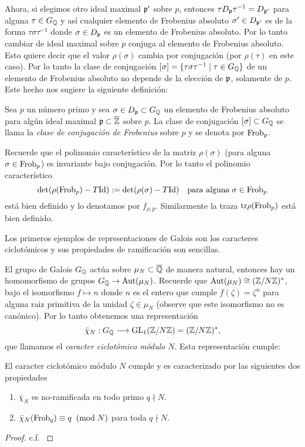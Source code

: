 \documentclass[../../tesis_maestria]{subfiles}
\begin{document}
Ahora, si elegimos otro ideal maximal $\mathfrak{p}'$ sobre $p$, entonces $\tau D_{\mathfrak{p}}\tau^{-1}=D_{\mathfrak{p}'}$ para alguna $\tau\in G_{\mathbb{Q}}$ y as\'i cualquier elemento de Frobenius absoluto $\sigma'\in D_{\mathfrak{p}'}$ es de la forma $\tau\sigma\tau^{-1}$ donde $\sigma\in D_{\mathfrak{p}}$ es un elemento de Frobenius absoluto. Por lo tanto cambiar de ideal maximal sobre $p$ conjuga al elemento de Frobenius absoluto. Esto quiere decir que el valor $\rho(\sigma)$ cambia por conjugaci\'on (por $\rho(\tau)$ en este caso). Por lo tanto la clase de conjugaci\'on $[\sigma]=\{\tau\sigma\tau^{-1}\mid\tau\in G_{\mathbb{Q}}\}$ de un elemento de Frobenius absoluto no depende de la elecci\'on de $\mathfrak{p}$, solamente de $p$. Este hecho nos sugiere la siguiente definici\'on:

\begin{defin}
  Sea $p$ un n\'umero primo y sea $\sigma\in D_{\mathfrak{p}}\subset G_{\mathbb{Q}}$ un elemento de Frobenius absoluto para alg\'un ideal maximal $\mathfrak{p}\subset\overline{\mathbb{Z}}$ sobre $p$. La clase de conjugaci\'on $[\sigma]\subset G_{\mathbb{Q}}$ se llama la \emph{clase de conjugaci\'on de Frobenius} sobre $p$ y se denota por $\mathrm{Frob}_p$.
\end{defin}

Recuerde que el polinomio caracter\'istico de la matriz $\rho(\sigma)$ (para alguna $\sigma\in\mathrm{Frob}_p$) es invariante bajo conjugaci\'on. Por lo tanto el polinomio caracter\'istico
\[
  \det(\rho(\mathrm{Frob}_p)-T\mathrm{Id}):=\det(\rho(\sigma)-T\mathrm{Id})
  \quad\text{para alguna}\;\sigma\in\mathrm{Frob}_p
\]
est\'a bien definido y lo denotamos por $f_{\rho,p}$. Similarmente la traza $\mathrm{tr}\rho(\mathrm{Frob}_p)$ est\'a bien definido.

Los primeros ejemplos de representaciones de Galois son los caracteres ciclot\'omicos y sus propiedades de ramificaci\'on son sencillas.

El grupo de Galois $G_{\mathbb{Q}}$ act\'ua sobre $\mu_N\subset\overline{\mathbb{Q}}$ de manera natural,
entonces hay un homomorfismo de grupos $G_{\mathbb{Q}}\rightarrow\text{Aut}(\mu_N)$. Recuerde que $\text{Aut}(\mu_N)\cong(\mathbb{Z}/N\mathbb{Z})^*$, bajo el isomorfismo $f\mapsto n$ donde $n$ es el entero que cumple $f(\zeta)=\zeta^n$ para alguna raiz primitiva de la unidad $\zeta\in\mu_N$ (observe que este isomorfismo no es can\'onico). Por lo tanto obtenemos una representaci\'on
\[
  \bar{\chi}_N:G_{\mathbb{Q}}\longrightarrow\mathrm{GL}_1(\mathbb{Z}/N\mathbb{Z})=(\mathbb{Z}/N\mathbb{Z})^*,
\]
que llamamos el \emph{caracter ciclot\'omico m\'odulo} $N$. Esta representaci\'on cumple:
\begin{prop}\label{prop:car_ciclo_modN} El caracter ciclot\'omico m\'odulo $N$ cumple y es caracterizado por las siguientes dos propiedades
\begin{enumerate}[label=\roman*)]
  \item $\bar{\chi}_N$ es no-ramificada en todo primo $q\nmid N$.
  \item $\bar{\chi}_N(\mathrm{Frob}_q)\equiv q\;\;(\mathrm{mod}\; N)$ para toda $q\nmid N$.
\end{enumerate}
\end{prop}
\begin{proof}
  c.f. \cite[\S5.2 proposici\'on 5.12 y \S8.1 teorema 8.7]{SaitoNumberTheory2}
\end{proof}
\end{document}

